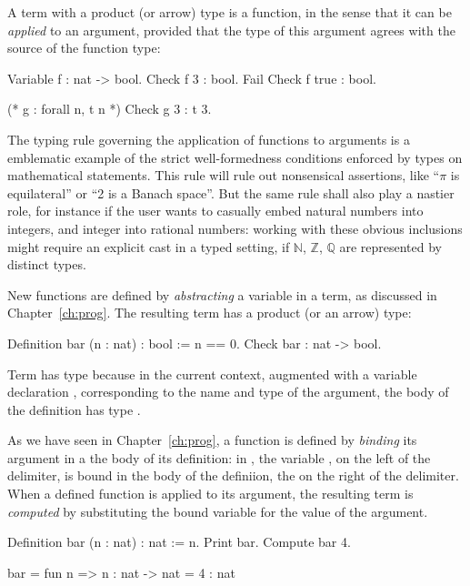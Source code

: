 A term with a product (or arrow) type is a function, in the sense that
it can be \emph{applied} to an argument, provided that the type of
this argument agrees with the source of the function type:

\begin{coq}{}{}
Variable f : nat -> bool.
Check f 3 : bool.
Fail Check f true : bool.

(* g : forall n, t n *)
Check g 3 : t 3.
\end{coq}

The typing rule governing the application of functions to arguments is
a emblematic example of the strict well-formedness conditions enforced
by types on mathematical statements. This rule will rule out
nonsensical assertions, like ``$\pi$ is equilateral'' or ``2 is a
Banach space''. But the same rule shall also play a nastier role, for
instance if the user wants to casually embed natural numbers into
integers, and integer into rational numbers: working with these
obvious inclusions might require an explicit cast in a typed setting,
if $\mathbb{N}$, $\mathbb{Z}$, $\mathbb{Q}$ are represented by
distinct types.


New functions are defined by \emph{abstracting} a variable in a term,
as discussed in Chapter~\ref{ch:prog}. The resulting term has a
product (or an arrow) type:

\begin{coq}{}{}
Definition bar (n : nat) : bool := 
  n == 0.
Check bar : nat -> bool.
\end{coq}

Term  has type  because in the current context,
augmented with a variable declaration , corresponding to
the name and type of the argument, the body  of the definition
 has type .

As we have seen in Chapter~\ref{ch:prog}, a function is defined by
\emph{binding} its argument in a the body of its definition: in
, the variable , on the left of the \C{:=} delimiter, is
bound in the body of the definiion, the  on the right of the \C{:=}
delimiter. When a defined function is applied to its argument, the
resulting term is \emph{computed} by substituting the bound variable
for the value of the argument.

\begin{coq-left}{}{}
Definition bar (n : nat) : nat := n.
Print bar.
Compute bar 4.
\end{coq-left}
\begin{coqout-right}
bar = fun n => n
    : nat -> nat 
= 4
: nat
\end{coqout-right}


